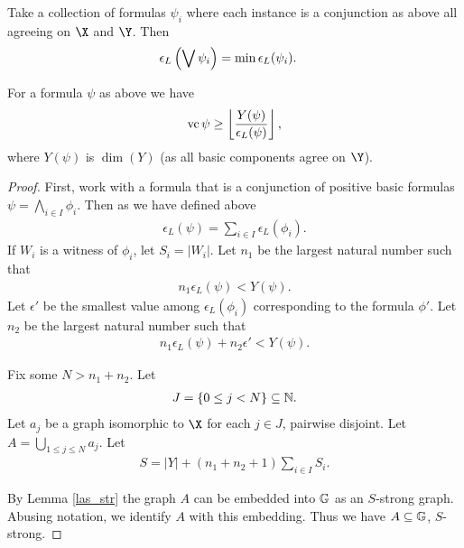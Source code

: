 \documentclass{amsart}
\begin{document}
\begin{Definition} [Disjunction]
  Take a collection of formulas $\psi_i$ where each instance is a conjunction as above all agreeing on $\X$ and $\Y$.
  Then
  \begin{align*}
    \epsilon_L\left(\bigvee \psi_i\right) &= \min \epsilon_L(\psi_i).
  \end{align*}
\end{Definition}
\begin{Theorem} \label{main_lower}
  For a formula $\psi$ as above we have
  \begin{align*}
    \operatorname{vc} \psi \geq \left \lfloor \frac{Y(\psi)}{\epsilon_L(\psi)} \right \rfloor,
  \end{align*}
  where $Y(\psi)$ is $\dim(Y)$ (as all basic components agree on $\Y$).
\end{Theorem}
\begin{proof}
  First, work with a formula that is a conjunction of positive basic formulas $\psi = \bigwedge_{i \in I} \phi_i$.
  Then as we have defined above
  \begin{align*}
    \epsilon_L(\psi) = \sum_{i \in I} \epsilon_L(\phi_i).
  \end{align*}
  If $W_i$ is a witness of $\phi_i$, let $S_i = |W_i|$.
  Let $n_1$ be the largest natural number such that
  \begin{align*}
    n_1 \epsilon_L(\psi) < Y(\psi).
  \end{align*}
  Let $\epsilon'$ be the smallest value among $\epsilon_L(\phi_i)$ corresponding to the formula $\phi'$.
  Let $n_2$ be the largest natural number such that
  \begin{align*}
    n_1 \epsilon_L(\psi) + n_2 \epsilon' < Y(\psi).
  \end{align*}

  Fix some $N > n_1 + n_2$.
  Let 
  \begin{align*}
    J = \left\{0 \leq j < N\right\} \subseteq \mathbb{N}.
  \end{align*}
  Let $a_j$ be a graph isomorphic to $\X$ for each $j \in J$, pairwise disjoint.
  Let $A = \bigcup_{1 \leq j \leq N} a_j$.
  Let 
  \begin{align*}
    S = |Y| + (n_1 + n_2 + 1) \sum_{i \in I} S_i.
  \end{align*}

  By Lemma \ref{las_str} the graph $A$ can be embedded into $\mathbb G$ as an $S$-strong graph. 
  Abusing notation, we identify $A$ with this embedding.
  Thus we have $A \subseteq \mathbb G$, $S$-strong. 


\end{proof}
\end{document}
